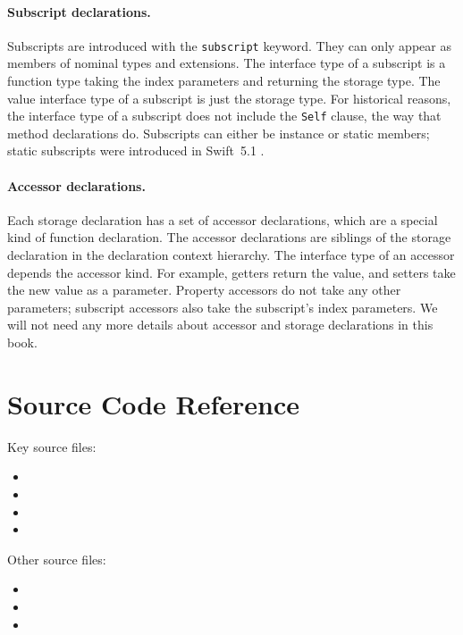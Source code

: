 \documentclass[../generics]{subfiles}
\begin{document}
\paragraph{Subscript declarations.} Subscripts are introduced with the \texttt{subscript} keyword. They can only appear as members of nominal types and extensions. The interface type of a subscript is a function type taking the index parameters and returning the storage type. The value interface type of a subscript is just the storage type. For historical reasons, the interface type of a subscript does not include the \texttt{Self} clause, the way that method declarations do. Subscripts can either be instance or static members; static subscripts were introduced in Swift~5.1 \cite{se0254}.

\paragraph{Accessor declarations.}
Each storage declaration has a set of accessor declarations, which are a special kind of function declaration. The accessor declarations are siblings of the storage declaration in the declaration context hierarchy. The interface type of an accessor depends the accessor kind. For example, getters return the value, and setters take the new value as a parameter. Property accessors do not take any other parameters; subscript accessors also take the subscript's index parameters. We will not need any more details about accessor and storage declarations in this book.

\section{Source Code Reference}\label{declarationssourceref}

Key source files:
\begin{itemize}
\item {}
\item {}
\item {}
\item {}
\end{itemize}
Other source files:
\begin{itemize}
\item {}
\item {}
\item {}
\end{itemize}
\end{document}
